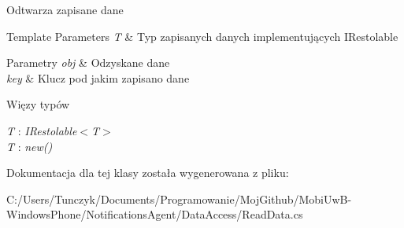Odtwarza zapisane dane 


\begin{DoxyTemplParams}{Template Parameters}
{\em T} & Typ zapisanych danych implementujących I\+Restolable\\
\hline
\end{DoxyTemplParams}

\begin{DoxyParams}{Parametry}
{\em obj} & Odzyskane dane\\
\hline
{\em key} & Klucz pod jakim zapisano dane\\
\hline
\end{DoxyParams}
\begin{Desc}
\item[Więzy typów]\begin{description}
\item[{\em T} : {\em I\+Restolable$<$T$>$}]\item[{\em T} : {\em new()}]\end{description}
\end{Desc}


Dokumentacja dla tej klasy została wygenerowana z pliku\+:\begin{DoxyCompactItemize}
\item 
C\+:/\+Users/\+Tunczyk/\+Documents/\+Programowanie/\+Moj\+Github/\+Mobi\+Uw\+B-\/\+Windows\+Phone/\+Notifications\+Agent/\+Data\+Access/Read\+Data.\+cs\end{DoxyCompactItemize}
